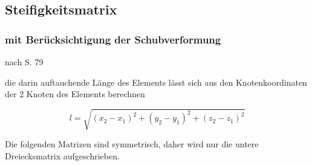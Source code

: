 \documentclass[11pt,titlepage,listof=totoc,bibliography=totoc,twoside]{scrreprt}
\begin{document}
\subsection{Steifigkeitsmatrix}

\subsubsection{mit Berücksichtigung der Schubverformung}

nach \cite{Prze1968} S. 79

die darin auftauchende Länge des Elements lässt sich aus den Knotenkoordinaten der 2 Knoten des Elements berechnen

\begin{equation*}
l=\sqrt{\left(x_2-x_1\right)^2+\left(y_2-y_1\right)^2+\left(z_2-z_1\right)^2}
\end{equation*}

Die folgenden Matrizen sind symmetrisch, daher wird nur die untere Dreiecksmatrix aufgeschrieben.
\end{document}
